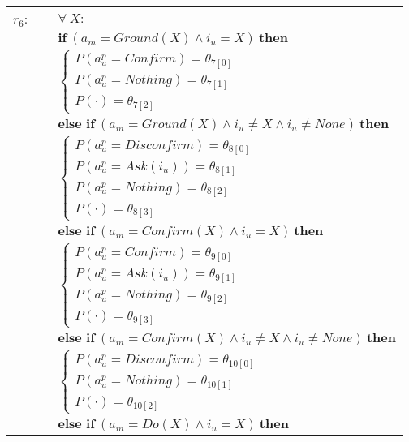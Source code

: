\begin{footnotesize}
\begin{longtable}{p{1cm}p{14cm}}
$r_{6}$: \ \ & $\forall \ X: $ \\ & $\textbf{if} \ (\mathit{a_m}\!=\!\mathit{Ground({X})} \land \mathit{i_u}\!=\!\mathit{{X}}) \ \textbf{then} $ \\
 & \;\;\;\;\; $ \begin{cases}P(\mathit{a_u^p}\!=\!\mathit{Confirm})\!=\!\theta_{\mathrm{7[0]}} \\
P(\mathit{a_u^p}\!=\!\mathit{Nothing})\!=\!\theta_{\mathrm{7[1]}} \\
P(\cdot)\!=\!\theta_{\mathrm{7[2]}} \end{cases}$\\[3mm] & $ \textbf{else if} \ (\mathit{a_m}\!=\!\mathit{Ground({X})} \land \mathit{i_u}\!\neq\!\mathit{{X}} \land \mathit{i_u}\!\neq\!\mathit{None}) \ \textbf{then}$ \\
& \;\;\;\;\; $ \begin{cases}P(\mathit{a_u^p}\!=\!\mathit{Disconfirm})\!=\!\theta_{\mathrm{8[0]}} \\
P(\mathit{a_u^p}\!=\!\mathit{Ask({i_u})})\!=\!\theta_{\mathrm{8[1]}} \\
P(\mathit{a_u^p}\!=\!\mathit{Nothing})\!=\!\theta_{\mathrm{8[2]}} \\
P(\cdot)\!=\!\theta_{\mathrm{8[3]}} \end{cases}$\\[3mm] & $ \textbf{else if} \ (\mathit{a_m}\!=\!\mathit{Confirm({X})} \land \mathit{i_u}\!=\!\mathit{{X}}) \ \textbf{then}$ \\
& \;\;\;\;\; $ \begin{cases}P(\mathit{a_u^p}\!=\!\mathit{Confirm})\!=\!\theta_{\mathrm{9[0]}} \\
P(\mathit{a_u^p}\!=\!\mathit{Ask({i_u})})\!=\!\theta_{\mathrm{9[1]}} \\
P(\mathit{a_u^p}\!=\!\mathit{Nothing})\!=\!\theta_{\mathrm{9[2]}} \\
P(\cdot)\!=\!\theta_{\mathrm{9[3]}} \end{cases}$\\[3mm] & $ \textbf{else if} \ (\mathit{a_m}\!=\!\mathit{Confirm({X})} \land \mathit{i_u}\!\neq\!\mathit{{X}} \land \mathit{i_u}\!\neq\!\mathit{None}) \ \textbf{then}$ \\
& \;\;\;\;\; $ \begin{cases}P(\mathit{a_u^p}\!=\!\mathit{Disconfirm})\!=\!\theta_{\mathrm{10[0]}} \\
P(\mathit{a_u^p}\!=\!\mathit{Nothing})\!=\!\theta_{\mathrm{10[1]}} \\
P(\cdot)\!=\!\theta_{\mathrm{10[2]}} \end{cases}$\\[3mm] & $ \textbf{else if} \ (\mathit{a_m}\!=\!\mathit{Do({X})} \land \mathit{i_u}\!=\!\mathit{{X}}) \ \textbf{then}$ \\

\end{longtable}
\end{footnotesize}
